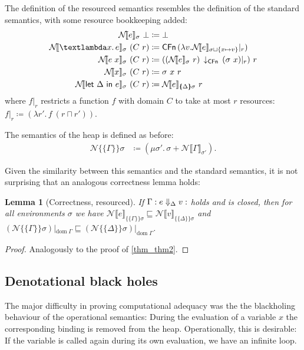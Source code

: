 \documentclass{jfp1}
\newtheorem{lemma}{Lemma}
\theoremstyle{nonumberbreak}
\newtheorem{proof}{Proof}
\newcommand{\sCFn}[1]{\text{\textsf{CFn}}\,(#1)}
\newcommand{\sCFnProj}[2]{#1\,\downarrow_{\text{\textsf{CFn}}}\,#2}
\newcommand{\keyword}[1]{\text{\textsf{#1}}}
\newcommand{\sApp}[2]{#1\;#2}
\newcommand{\sLam}[2]{\text{\textlambda} #1.\, #2}
\newcommand{\sLet}[2]{\keyword{let}~#1~\keyword{in}~#2}
\newcommand{\sred}[5]{#1 : #2 \Downarrow_{#3} #4 : #5}
\newcommand{\dom}[1]{\text{dom}\;#1}
\newcommand{\esem}[1]{\{\!\!\!\{#1\}\!\!\!\}}
\newcommand{\dsemr}[2]{\mathcal N\!\llbracket #1 \rrbracket_{#2}}
\newcommand{\esemr}[1]{\mathcal N\!\!\{\!\!\!\{#1\}\!\!\!\}}
\newcommand{\upd}[1]{\mathop{++_{#1}}}
\newcommand{\Crestr}[2]{ #1 |_{#2}}
\begin{document}
The definition of the resourced semantics resembles the definition of the standard semantics, with some resource bookkeeping added:
\begin{align*}
\dsemr{e}\sigma~ \bot &\coloneqq \bot\\
\dsemr{\sLam x e}\sigma ~ (C~r) &\coloneqq \sCFn{\lambda v. \Crestr{\dsemr e {\sigma \sqcup \{x \mapsto v\}}} r}\\
\dsemr{\sApp e  x}\sigma ~ (C~r) &\coloneqq (\sCFnProj {(\dsemr e \sigma~r)}{\Crestr{(\sigma~x)} r})~r\\
\dsemr{x}\sigma ~ (C~r) &\coloneqq \sigma~x~r\\
\dsemr{\sLet{\Delta}e}\sigma ~ (C~r) &\coloneqq \dsemr e {\esem{\Delta}\sigma}~r
\end{align*}
where $\Crestr{f}{r}$ restricts a function $f$ with domain $C$ to take at most $r$ resources: $\Crestr f r \coloneqq (\lambda r'.\, f ~(r \sqcap r'))$.

The semantics of the heap is defined as before:
\begin{align*}
\esemr{\Gamma}\sigma &\coloneqq (\mu \sigma'.\, \sigma \upd{\dom \Gamma} \dsemr{\Gamma}{\sigma'}).
\end{align*}

Given the similarity between this semantics and the standard semantics, it is not surprising that an analogous correctness lemma holds:

\begin{lemma}[Correctness, resourced]
If $\sred \Gamma e \Delta v$ holds and is closed, then for all environments $\sigma$ we have $\dsemr{e}{\esem{\Gamma}{\sigma}} \sqsubseteq \dsemr{v}{\esem{\Delta}{\sigma}}$ and $(\esemr\Gamma\sigma)|_{\dom\Gamma} \sqsubseteq (\esemr\Delta\sigma)|_{\dom\Gamma}$.%
\label{lem_resourced_correctness}
\end{lemma}

\begin{proof}
Analogously to the proof of \autoref{thm_thm2}.
\end{proof}

\subsection{Denotational black holes}
\label{sec_denblackhole}

The major difficulty in proving computational adequacy was the the blackholing behaviour of the operational semantics: During the evaluation of a variable $x$ the corresponding binding is removed from the heap. Operationally, this is desirable: If the variable is called again during its own evaluation, we have an infinite loop.
\end{document}
